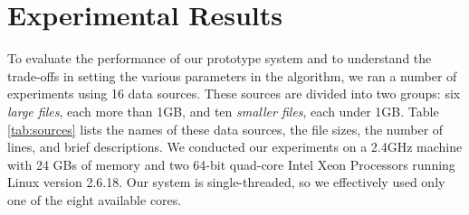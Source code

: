 \section{Experimental Results}
\label{sec:eval}

To evaluate the performance of our prototype system and to understand the
trade-offs in setting the various parameters in the algorithm, we ran a number
of experiments using 16 data sources. These sources are divided into two groups:
six {\em large files}, each more than 1GB, 
and ten {\em smaller files}, each under 1GB. 
Table \ref{tab:sources} lists the names of these data sources, the file sizes,
the number of lines, and brief descriptions. We conducted our experiments
on a 2.4GHz machine with 24 GBs of memory and two 64-bit quad-core Intel Xeon Processors 
running Linux version 2.6.18. Our system is single-threaded, so we effectively used only 
one of the eight available cores.

